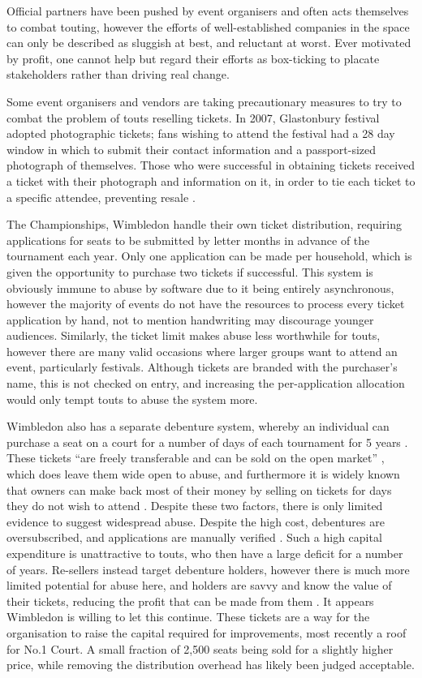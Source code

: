 \documentclass[12pt]{bhamdissertation}
\begin{document}
Official partners have been pushed by event organisers and often acts themselves to combat touting, however the efforts of well-established companies in the space can only be described as sluggish at best, and reluctant at worst. Ever motivated by profit, one cannot help but regard their efforts as box-ticking to placate stakeholders rather than driving real change.

Some event organisers and vendors are taking precautionary measures to try to combat the problem of touts reselling tickets. In 2007, Glastonbury festival adopted photographic tickets; fans wishing to attend the festival had a 28 day window in which to submit their contact information and a passport-sized photograph of themselves. Those who were successful in obtaining tickets received a ticket with their photograph and information on it, in order to tie each ticket to a specific attendee, preventing resale \autocite{B07}.

The Championships, Wimbledon handle their own ticket distribution, requiring applications for seats to be submitted by letter months in advance of the tournament each year. Only one application can be made per household, which is given the opportunity to purchase two tickets if successful. This system is obviously immune to abuse by software due to it being entirely asynchronous, however the majority of events do not have the resources to process every ticket application by hand, not to mention handwriting may discourage younger audiences. Similarly, the ticket limit makes abuse less worthwhile for touts, however there are many valid occasions where larger groups want to attend an event, particularly festivals. Although tickets are branded with the purchaser's name, this is not checked on entry, and increasing the per-application allocation would only tempt touts to abuse the system more.

Wimbledon also has a separate debenture system, whereby an individual can purchase a seat on a court for a number of days of each tournament for 5 years \autocite{W16}. These tickets ``are freely transferable and can be sold on the open market'' \autocite{TCW16}, which does leave them wide open to abuse, and furthermore it is widely known that owners can make back most of their money by selling on tickets for days they do not wish to attend \autocite{N14}. Despite these two factors, there is only limited evidence to suggest widespread abuse. Despite the high cost, debentures are oversubscribed, and applications are manually verified \autocite{TCW16}. Such a high capital expenditure is unattractive to touts, who then have a large deficit for a number of years. Re-sellers instead target debenture holders, however there is much more limited potential for abuse here, and holders are savvy and know the value of their tickets, reducing the profit that can be made from them \autocite{W16}. It appears Wimbledon is willing to let this continue. These tickets are a way for the organisation to raise the capital required for improvements, most recently a roof for No.1 Court. A small fraction of 2,500 seats being sold for a slightly higher price, while removing the distribution overhead has likely been judged acceptable.
\end{document}
